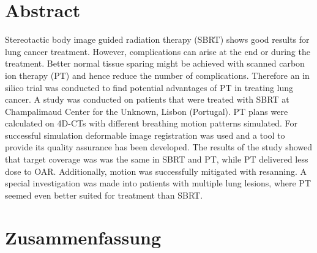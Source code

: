 \section*{Abstract}


Stereotactic body image guided radiation therapy (SBRT) shows good results for lung cancer treatment. However, complications can arise at the end or during the treatment. 
Better normal tissue sparing might be achieved with scanned carbon ion therapy (PT) and hence reduce the number of complications. Therefore an in silico trial was conducted to find potential advantages of PT in treating lung cancer. 
A study was conducted on patients that were treated with SBRT at Champalimaud Center for the Unknown, Lisbon (Portugal). PT plans were calculated on 4D-CTs with different breathing motion patterns simulated. For successful simulation
deformable image registration was used and a tool to provide its quality assurance has been developed. 
The results of the study showed that target coverage was was the same in SBRT and PT, while PT delivered less dose to OAR. Additionally, motion was successfully mitigated with resanning. 
A special investigation was made into patients with multiple lung lesions, where PT seemed even better suited for treatment than SBRT.



\section*{Zusammenfassung}

